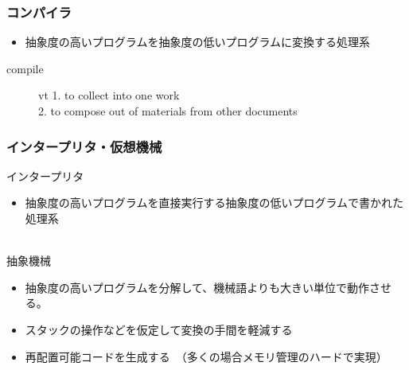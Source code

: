 \documentclass[ckj,dvipdfmx]{beamer}
\begin{document}

\begin{frame}
  \frametitle{コンパイラ}
  \begin{itemize}
    \item 抽象度の高いプログラムを抽象度の低いプログラムに変換する処理系\\
  \end{itemize}
  \vspace*{1zw}
  \begin{description}
    \item [compile] vt 1. to collect into one work\\
2. to compose out of materials from other documents
  \end{description}
\end{frame}

\begin{frame}
  \frametitle{インタープリタ・仮想機械}
  \begin{list}{}{}
  \item インタープリタ
   \begin{itemize}
    \item 抽象度の高いプログラムを直接実行する抽象度の低いプログラムで書かれた処理系\\
    \\
  \end{itemize}
  \item 抽象機械
  \begin{itemize}
    \item 抽象度の高いプログラムを分解して、機械語よりも大きい単位で動作させる。
    \item スタックの操作などを仮定して変換の手間を軽減する
    \item 再配置可能コードを生成する　（多くの場合メモリ管理のハードで実現）
  \end{itemize}
  \end{list}
\end{frame}
\end{document}
